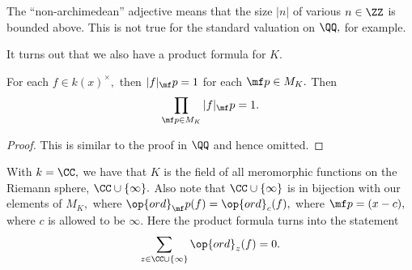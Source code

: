 \begin{remark}
	The ``non-archimedean'' adjective means that the size $|n|$ of various $n\in\ZZ$ is bounded above. This is not true for the standard valuation on $\QQ,$ for example.
\end{remark}
It turns out that we also have a product formula for $K.$
\begin{theorem}
	For each $f\in k(x)^\times,$ then $|f|_\mf p=1$ for each $\mf p\in M_K.$ Then
	\[\prod_{\mf p\in M_K}|f|_\mf p=1.\]
\end{theorem}
\begin{proof}
	This is similar to the proof in $\QQ$ and hence omitted.
\end{proof}
\begin{example}
	With $k=\CC,$ we have that $K$ is the field of all meromorphic functions on the Riemann sphere, $\CC\cup\{\infty\}.$ Also note that $\CC\cup\{\infty\}$ is in bijection with our elements of $M_K,$ where $\op{ord}_\mf p(f)=\op{ord}_c(f),$ where $\mf p=(x-c),$ where $c$ is allowed to be $\infty.$ Here the product formula turns into the statement
	\[\sum_{z\in\CC\cup\{\infty\}}\op{ord}_z(f)=0.\]
\end{example}

